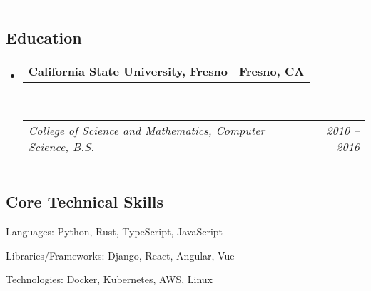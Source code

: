 \documentclass[10pt,letterpaper]{article}
\makeatletter
\newenvironment{indentsection}[1]%
{\begin{list}{}%
	{\setlength{\leftmargin}{#1}}%
	\item[]%
}
{\end{list}}
\newcommand{\headerrow}[2]
{\begin{tabular*}{\linewidth}{l@{\extracolsep{\fill}}r}
	#1 &
	#2 \\
\end{tabular*}}
\makeatother
\begin{document}
\hrule
\vspace{-0.4em}
\subsection*{Education}

\begin{itemize}
	\parskip=0.1em

	\item
	      \headerrow
	      {\textbf{California State University, Fresno}}
	      {\textbf{Fresno, CA}}
	      \\
	      \headerrow
	      {\emph{College of Science and Mathematics, Computer Science, B.S.}}
	      {\emph{2010 -- 2016}}

\end{itemize}


\hrule
\vspace{-0.4em}
\subsection*{Core Technical Skills}

\begin{indentsection}{\parindent}
	\begin{description*}
		\item[Languages:]
			Python, Rust, TypeScript, JavaScript
		\item[Libraries/Frameworks:]
			Django, React, Angular, Vue
		\item[Technologies:]
			Docker, Kubernetes, AWS, Linux
	\end{description*}
\end{indentsection}
\end{document}
